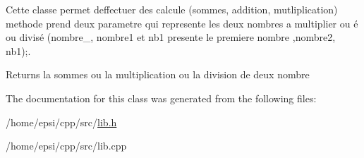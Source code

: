 Cette classe permet d\textquotesingle{}effectuer des calcule (sommes, addition, mutliplication)  methode prend deux parametre qui represente les deux nombres a multiplier ou é ou divisé (nombre\+\_, nombre1 et nb1 presente le premiere nombre ,nombre2, nb1);. 

\begin{DoxyReturn}{Returns}
la sommes ou la multiplication ou la division de deux nombre 
\end{DoxyReturn}


The documentation for this class was generated from the following files\+:\begin{DoxyCompactItemize}
\item 
/home/epsi/cpp/src/\hyperlink{lib_8h}{lib.\+h}\item 
/home/epsi/cpp/src/lib.\+cpp\end{DoxyCompactItemize}
